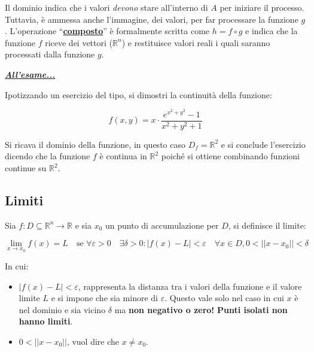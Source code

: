 \documentclass[a4paper]{article}
\newcommand{\dquotes}[1]{``#1''}
\begin{document}
	\noindent
	Il dominio indica che i valori \emph{devono} stare all'interno di $A$ per iniziare il processo. Tuttavia, è ammessa anche l'immagine, dei valori, per far processare la funzione $g$.\newline
	L'operazione \textcolor{Red3}{\dquotes{\textbf{\underline{composto}}}} è formalmente scritta come $h = f \circ g$ e indica che la funzione $f$ riceve dei vettori ($\mathbb{R}^{n}$) e restituisce valori reali i quali saranno processati dalla funzione $g$.\newline
	
	\noindent
	\textcolor{Red3}{\textbf{\underline{\emph{All'esame...}}}}\newline
	
	\noindent
	Ipotizzando un esercizio del tipo, si dimostri la continuità della funzione:
	
	\begin{equation*}
		f\left(x,y\right) = x \cdot \dfrac{e^{x^{2} + y^{2}} - 1}{x^{2} + y^{2} + 1}
	\end{equation*}

	\noindent
	Si ricava il dominio della funzione, in questo caso $D_{f} = \mathbb{R}^{2}$ e si conclude l'esercizio dicendo che la funzione $f$ è continua in $\mathbb{R}^{2}$ poiché si ottiene combinando funzioni continue su $\mathbb{R}^{2}$.
	
	\newpage
	
	\subsection{Limiti}
	
	Sia $f: D \subseteq \mathbb{R}^{n} \longrightarrow \mathbb{R}$ e sia $x_{0}$ un punto di accumulazione per $D$, si definisce il limite:
	
	\begin{equation*}
		\lim_{x \rightarrow x_{0}} f\left(x\right) = L \hspace{1em} \text{se } \forall\varepsilon > 0 \hspace{1em} \exists\delta > 0 : \left|f\left(x\right) - L\right| < \varepsilon \hspace{1em} \forall x \in D, 0 < \Big|\left|x - x_{0}\right|\Big| < \delta
	\end{equation*}
	
	\noindent
	In cui:
	
	\begin{itemize}
		\item $\Big|f\left(x\right) - L\Big| < \varepsilon$, rappresenta la distanza tra i valori della funzione e il valore limite $L$ e si impone che sia minore di $\varepsilon$. Questo vale solo nel caso in cui $x$ è nel dominio e sia vicino $\delta$ ma \textbf{non negativo o zero!} \textcolor{Red3}{\textbf{Punti isolati non hanno limiti}}.
		
		\item $0 < \Big||x-x_{0}|\Big|$, vuol dire che $x \ne x_{0}$.
	\end{itemize}
	
\end{document}
